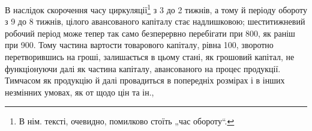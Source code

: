 В наслідок скорочення часу циркуляції\footnote*{
В нім. тексті, очевидно, помилково стоїть „час обороту“. 
} з 3 до 2 тижнів, а тому й
періоду обороту з 9 до 8 тижнів,  цілого авансованого капіталу
стає надлишковою; шеститижневий робочий період може тепер так само
безперервно перебігати при 800, як раніш при 900.
Тому частина вартости товарового капіталу, рівна 100, зворотно
перетворившись на гроші, залишається в цьому стані, як грошовий
капітал, не функціонуючи далі як частина капіталу, авансованого на
процес продукції. Тимчасом як продукцію й далі провадиться в попередніх
розмірах і в інших незмінних умовах, як от щодо цін та ін.,
\parbreak{}  %
